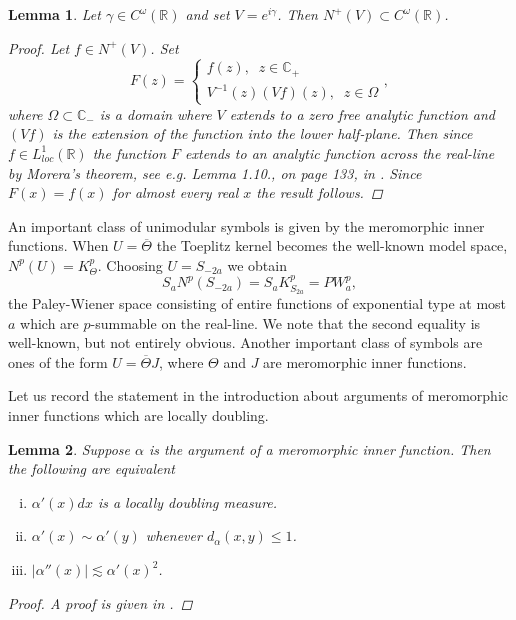 \documentclass{article}[12pt]
\newtheorem{lemma}{Lemma}
\theoremstyle{remark}
\begin{document}
\begin{lemma}
    Let $\gamma \in C^{\omega}(\mathbb{R})$ and set $V = e^{i\gamma}$. Then $N^{+}(V) \subset C^{\omega}(\mathbb{R})$.
    \begin{proof}
        Let $f \in N^{+}(V)$. Set
        \begin{equation*}
            F(z) = \begin{cases}
                f(z), \; \; z \in \mathbb{C}_{+} \\
                V^{-1}(z)(Vf)(z), \; \;z \in \Omega
            \end{cases},
        \end{equation*}
        where $\Omega \subset \mathbb{C}_{-}$ is a domain where $V$ extends to a zero free analytic function and $(Vf)$ is the extension of the function into the lower half-plane. Then since $f \in L^{1}_{loc}(\mathbb{R})$ the function $F$ extends to an analytic function across the real-line by Morera's theorem, see e.g. Lemma 1.10., on page 133, in \cite{MR2261424}. Since $F(x) = f(x)$ for almost every real $x$ the result follows.
    \end{proof}
\end{lemma}

An important class of unimodular symbols is given by the meromorphic inner functions. When $U = \overline{\Theta}$ the Toeplitz kernel becomes the well-known model space, $N^{p}(U) = K_{\Theta}^{p}$. Choosing $U = S_{-2a}$ we obtain
\begin{equation*}
    S_{a}N^{p}(S_{-2a}) = S_{a}K_{S_{2a}}^{p} = PW_{a}^{p},
\end{equation*}
the Paley-Wiener space consisting of entire functions of exponential type at most $a$ which are $p$-summable on the real-line. We note that the second equality is well-known, but not entirely obvious. Another important class of symbols are ones of the form $U = \overline{\Theta}J$, where $\Theta$ and $J$ are meromorphic inner functions.

Let us record the statement in the introduction about arguments of meromorphic inner functions which are locally doubling.

\begin{lemma}
    Suppose $\alpha$ is the argument of a meromorphic inner function. Then the following are equivalent
    \begin{enumerate}[(i)]
        \item $\alpha'(x)dx$ is a locally doubling measure.
        \item $\alpha'(x) \sim \alpha'(y)$ whenever $d_{\alpha}(x,y) \leq 1$.
        \item $\lvert \alpha''(x) \rvert \lesssim \alpha'(x)^{2}$.
    \end{enumerate}
    \begin{proof}
        A proof is given in \cite{MR2944102}.
    \end{proof}
\end{lemma}
\end{document}
